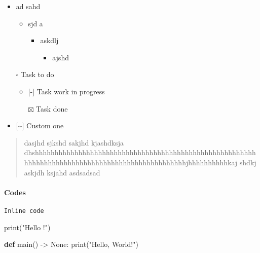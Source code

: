 \documentclass[
]{article}
\newenvironment{Shaded}{}{}
\newcommand{\BuiltInTok}[1]{\textcolor[rgb]{0.00,0.50,0.00}{#1}}
\newcommand{\KeywordTok}[1]{\textcolor[rgb]{0.00,0.44,0.13}{\textbf{#1}}}
\newcommand{\NormalTok}[1]{#1}
\newcommand{\OperatorTok}[1]{\textcolor[rgb]{0.40,0.40,0.40}{#1}}
\newcommand{\StringTok}[1]{\textcolor[rgb]{0.25,0.44,0.63}{#1}}
\newcommand{\VariableTok}[1]{\textcolor[rgb]{0.10,0.09,0.49}{#1}}
\providecommand{\tightlist}{%
  \setlength{\itemsep}{0pt}\setlength{\parskip}{0pt}}
\begin{document}
\begin{itemize}
\tightlist
\item
  ad sahd

  \begin{itemize}
  \tightlist
  \item
    sjd a

    \begin{itemize}
    \tightlist
    \item
      askdlj

      \begin{itemize}
      \tightlist
      \item
        ajshd
      \end{itemize}
    \end{itemize}
  \end{itemize}
\item[$\square$]
  Task to do

  \begin{itemize}
  \tightlist
  \item
    {[}-{]} Task work in progress
  \item[$\boxtimes$]
    Task done
  \end{itemize}
\item
  {[}\textasciitilde{]} Custom one
\end{itemize}

\begin{quote}
dasjhd sjkshd sakjhd kjashdksja
dhshhhhhhhhhhhhhhhhhhhhhhhhhhhhhhhhhhhhhhhhhhhhhhhhhhhhhhhhhhhhhhhhhhhhhhhhhhhhhhhhhhhhhhhhhhhhhhhhhjhhhhhhhhhhkaj
shdkj askjdh ksjahd asdsadsad
\end{quote}

\paragraph{Codes}\label{codes}

\texttt{Inline\ code}

\begin{Shaded}
\begin{Highlighting}[]
\BuiltInTok{print}\NormalTok{(}\StringTok{"Hello !"}\NormalTok{)}
\end{Highlighting}
\end{Shaded}

\begin{Shaded}
\begin{Highlighting}[]
\KeywordTok{def}\NormalTok{ main() }\OperatorTok{{-}\textgreater{}} \VariableTok{None}\NormalTok{:}
    \BuiltInTok{print}\NormalTok{(}\StringTok{"Hello, World!"}\NormalTok{)}
\end{Highlighting}
\end{Shaded}
\end{document}
